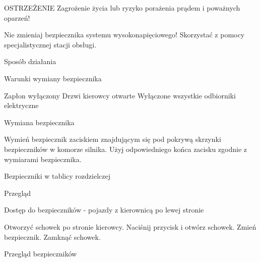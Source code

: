 OSTRZEŻENIE
Zagrożenie życia lub ryzyko porażenia prądem i poważnych oparzeń!
\begin{itemizeTriangle}
	\itemTriangle Nie zmieniaj bezpiecznika systemu wysokonapięciowego!
	\itemTriangle Skorzystać z pomocy specjalistycznej stacji obsługi.
\end{itemizeTriangle}

Sposób działania


Warunki wymiany bezpiecznika
\begin{itemizeTick}
	\itemTick Zapłon wyłączony
	\itemTick Drzwi kierowcy otwarte
	\itemTick Wyłączone wszystkie odbiorniki elektryczne
\end{itemizeTick}

Wymiana bezpiecznika


\begin{itemizeArrow}
	\itemArrow Wymień bezpiecznik zaciskiem znajdującym się pod pokrywą skrzynki bezpieczników w komorze silnika.
	\itemArrow Użyj odpowiedniego końca zacisku zgodnie z wymiarami bezpiecznika.
\end{itemizeArrow}

Bezpieczniki w tablicy rozdzielczej

Przegląd

Dostęp do bezpieczników - pojazdy z kierownicą po lewej stronie


\begin{itemizeArrow}
	\itemArrow Otworzyć schowek po stronie kierowcy.
	\itemArrow Naciśnij przycisk i otwórz schowek.
	\itemArrow Zmień bezpiecznik.
	\itemArrow Zamknąć schowek.
\end{itemizeArrow}

Przegląd bezpieczników


